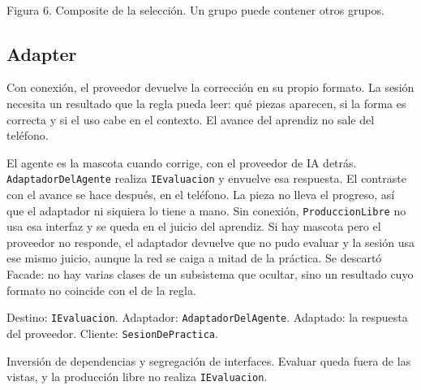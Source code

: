 \documentclass[11pt]{article}
\begin{document}
\begin{center}
\\[0.3em]
{\small Figura 6. Composite de la selección. Un grupo puede contener otros grupos.}
\end{center}

\subsection{Adapter}

\begin{description}
  \raggedright
  \item[Problema.] Con conexión, el proveedor devuelve la corrección en su propio formato. La sesión necesita un resultado que la regla pueda leer: qué piezas aparecen, si la forma es correcta y si el uso cabe en el contexto. El avance del aprendiz no sale del teléfono.
  \item[Solución.] El agente es la mascota cuando corrige, con el proveedor de IA detrás. \texttt{AdaptadorDelAgente} realiza \texttt{IEvaluacion} y envuelve esa respuesta. El contraste con el avance se hace después, en el teléfono. La pieza no lleva el progreso, así que el adaptador ni siquiera lo tiene a mano. Sin conexión, \texttt{ProduccionLibre} no usa esa interfaz y se queda en el juicio del aprendiz. Si hay mascota pero el proveedor no responde, el adaptador devuelve que no pudo evaluar y la sesión usa ese mismo juicio, aunque la red se caiga a mitad de la práctica. Se descartó Facade: no hay varias clases de un subsistema que ocultar, sino un resultado cuyo formato no coincide con el de la regla.
  \item[Participantes.] Destino: \texttt{IEvaluacion}. Adaptador: \texttt{AdaptadorDelAgente}. Adaptado: la respuesta del proveedor. Cliente: \texttt{SesionDePractica}.
  \item[SOLID.] Inversión de dependencias y segregación de interfaces. Evaluar queda fuera de las vistas, y la producción libre no realiza \texttt{IEvaluacion}.
\end{description}
\end{document}
